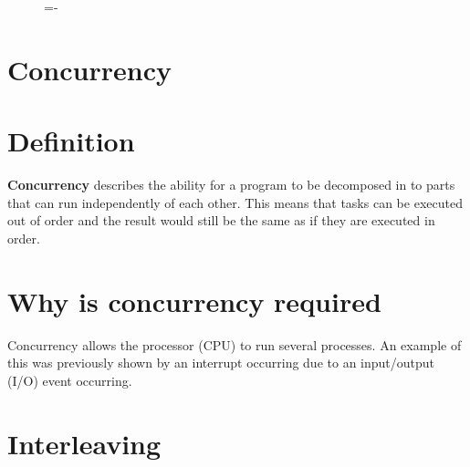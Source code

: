 \documentclass[a4paper]{systems-software}
\begin{document}
\begin{figure}[H]
  \lineskip=-\fboxrule
\end{figure}


\section{Concurrency}

\section*{Definition}

\textbf{Concurrency} describes the ability for a program to be decomposed in to parts that can run independently of each other. This means that tasks can be executed out of order and the result would still be the same as if they are executed in order.


\section*{Why is concurrency required}

Concurrency allows the processor (CPU) to run several processes. An example of this was previously shown by an interrupt occurring due to an input/output (I/O) event occurring.


\section*{Interleaving}
\end{document}
